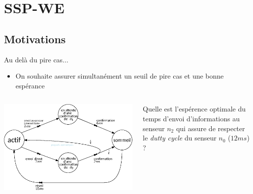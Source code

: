\documentclass[compress]{beamer}
\begin{document}
\section{SSP-WE}
\subsection{Motivations}
\begin{frame}{Au delà du pire cas...}
  \begin{itemize}
    \item On souhaite assurer simultanément un {\color{fibeamer@orange}seuil de pire cas} et une {\color{fibeamer@orange}bonne espérance}
  \end{itemize}
  \begin{columns}
    \begin{column}{0.5\linewidth}
      \includegraphics[width=\linewidth]{resources/main-mdp}
    \end{column}
    \begin{column}{0.5\linewidth}
      Quelle est l'espérence optimale du temps d'envoi d'informations au senseur $n_2$ qui assure de respecter le \textit{dutty cycle} du senseur $n_0$ ($12 ms$)  ?
    \end{column}
  \end{columns}
\end{frame}
\end{document}
